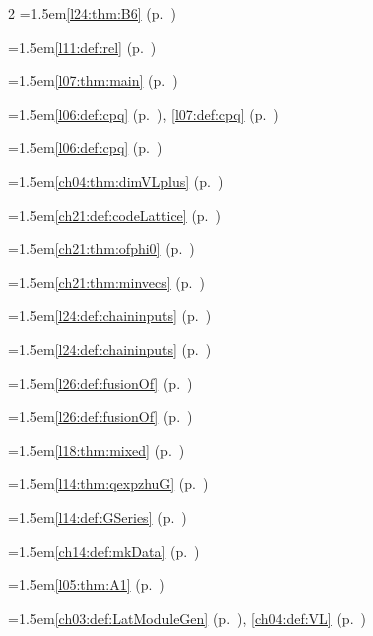 \begin{multicols}{2}
\hangindent=1.5em\quad \ref{l24:thm:B6} (p.~\pageref{l24:thm:B6})\par
\hangindent=1.5em\quad \ref{l11:def:rel} (p.~\pageref{l11:def:rel})\par
\hangindent=1.5em\quad \ref{l07:thm:main} (p.~\pageref{l07:thm:main})\par
\hangindent=1.5em\quad \ref{l06:def:cpq} (p.~\pageref{l06:def:cpq}), \ref{l07:def:cpq} (p.~\pageref{l07:def:cpq})\par
\hangindent=1.5em\quad \ref{l06:def:cpq} (p.~\pageref{l06:def:cpq})\par
\hangindent=1.5em\quad \ref{ch04:thm:dimVLplus} (p.~\pageref{ch04:thm:dimVLplus})\par
\hangindent=1.5em\quad \ref{ch21:def:codeLattice} (p.~\pageref{ch21:def:codeLattice})\par
\hangindent=1.5em\quad \ref{ch21:thm:ofphi0} (p.~\pageref{ch21:thm:ofphi0})\par
\hangindent=1.5em\quad \ref{ch21:thm:minvecs} (p.~\pageref{ch21:thm:minvecs})\par
\hangindent=1.5em\quad \ref{l24:def:chaininputs} (p.~\pageref{l24:def:chaininputs})\par
\hangindent=1.5em\quad \ref{l24:def:chaininputs} (p.~\pageref{l24:def:chaininputs})\par
\hangindent=1.5em\quad \ref{l26:def:fusionOf} (p.~\pageref{l26:def:fusionOf})\par
\hangindent=1.5em\quad \ref{l26:def:fusionOf} (p.~\pageref{l26:def:fusionOf})\par
\hangindent=1.5em\quad \ref{l18:thm:mixed} (p.~\pageref{l18:thm:mixed})\par
\hangindent=1.5em\quad \ref{l14:thm:qexpzhuG} (p.~\pageref{l14:thm:qexpzhuG})\par
\hangindent=1.5em\quad \ref{l14:def:GSeries} (p.~\pageref{l14:def:GSeries})\par
\hangindent=1.5em\quad \ref{ch14:def:mkData} (p.~\pageref{ch14:def:mkData})\par
\hangindent=1.5em\quad \ref{l05:thm:A1} (p.~\pageref{l05:thm:A1})\par
\hangindent=1.5em\quad \ref{ch03:def:LatModuleGen} (p.~\pageref{ch03:def:LatModuleGen}), \ref{ch04:def:VL} (p.~\pageref{ch04:def:VL})\par

\end{multicols}
